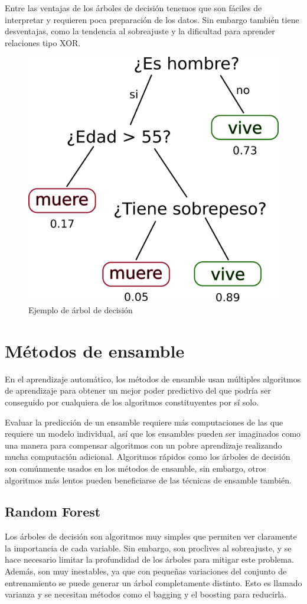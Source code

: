 Entre las ventajas de los árboles de decisión tenemos que son fáciles de interpretar y requieren poca preparación de los datos. Sin embargo también tiene desventajas, como la tendencia al sobreajuste y la dificultad para aprender relaciones tipo XOR.

\begin{figure}[htbp]
    \centering
    \includegraphics[width=0.4\linewidth]{graficos/propios/arbol_decision.png}
    \caption{Ejemplo de árbol de decisión}
    \label{fig:dt-eg}
\end{figure}

\section{Métodos de ensamble}

En el aprendizaje automático, los métodos de ensamble usan múltiples algoritmos de aprendizaje para obtener un mejor poder predictivo del que podría ser conseguido por cualquiera de los algoritmos constituyentes por sí solo.

Evaluar la predicción de un ensamble requiere más computaciones de las que requiere un modelo individual, así que los ensambles pueden ser imaginados como una manera para compensar algoritmos con un pobre aprendizaje realizando mucha computación adicional. Algoritmos rápidos como los árboles de decisión son comúnmente usados en los métodos de ensamble, sin embargo, otros algoritmos más lentos pueden beneficiarse de las técnicas de ensamble también.

\subsection{Random Forest}

Los árboles de decisión son algoritmos muy simples que permiten ver claramente la importancia de cada variable. Sin embargo, son proclives al sobreajuste, y se hace necesario limitar la profundidad de los árboles para mitigar este problema. Además, son muy inestables, ya que con pequeñas variaciones del conjunto de entrenamiento se puede generar un árbol completamente distinto. Esto es llamado varianza y se necesitan métodos como el bagging y el boosting para reducirla.

